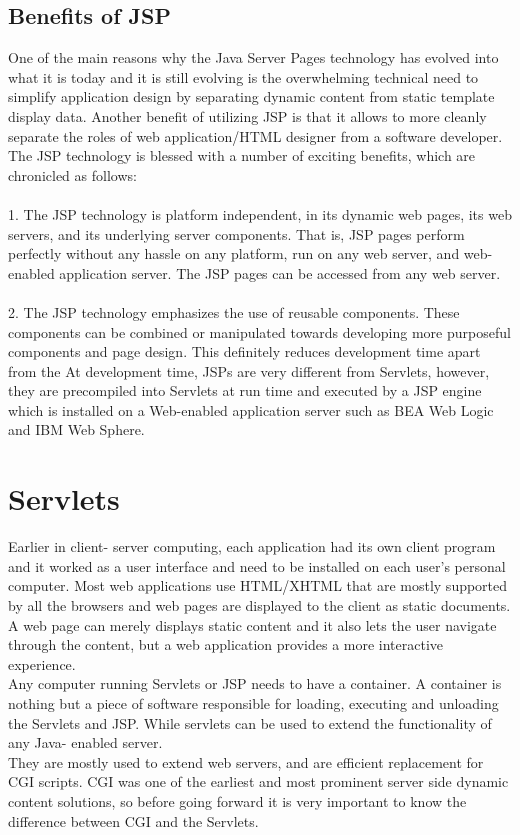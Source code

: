 \documentclass[BTech]{srmuthesis}
\begin{document}
\subsection{Benefits of JSP}
One of the main reasons why the Java Server Pages technology has evolved into what it is today and it is still evolving is the overwhelming technical need to simplify application design by separating dynamic content from static template display data. Another benefit of utilizing JSP is that it allows to more cleanly separate the roles of web application/HTML designer from a software developer. The JSP technology is blessed with a number of exciting benefits, which are chronicled as follows: \\\\
1. The JSP technology is platform independent, in its dynamic web pages, its web servers, and its underlying server components. That is, JSP pages perform perfectly without any hassle on any platform, run on any web server, and web-enabled application server. The JSP pages can be accessed from any web server. \\\\
2. The JSP technology emphasizes the use of reusable components. These components can be combined or manipulated towards developing more purposeful components and page design. This definitely reduces development time apart from the At development time, JSPs are very different from Servlets, however, they are precompiled into Servlets at run time and executed by a JSP engine which is installed on a Web-enabled application server such as BEA Web Logic and IBM Web Sphere.\\
\section{Servlets}
Earlier in client- server computing, each application had its own client program and it worked as a user interface and need to be installed on each user's personal computer. Most web applications use HTML/XHTML that are mostly supported by all the browsers and web pages are displayed to the client as static documents. \\ 
A web page can merely displays static content and it also lets the user navigate through the content, but a web application provides a more interactive experience. \\
Any computer running Servlets or JSP needs to have a container. A container is nothing but a piece of software responsible for loading, executing and unloading the Servlets and JSP. While servlets can be used to extend the functionality of any Java- enabled server. \\
They are mostly used to extend web servers, and are efficient replacement for \ac{CGI} scripts. \ac{CGI} was one of the earliest and most prominent server side dynamic content solutions, so before going forward it is very important to know the difference between CGI and the Servlets.\\
\end{document}

